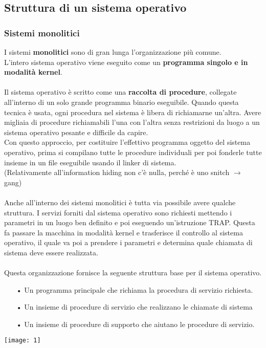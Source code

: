 \documentclass{article}
\begin{document}
\newpage
\subsection{Struttura di un sistema operativo}
\subsubsection{Sistemi monolitici}
I sistemi \textbf{monolitici} sono di gran lunga l’organizzazione più comune.
\\L’intero sistema operativo viene eseguito come un \textbf{programma singolo e in modalità kernel}.
\\\\Il sistema operativo è scritto come una \textbf{raccolta di procedure}, collegate all’interno di un solo grande programma binario eseguibile. Quando questa tecnica è usata, ogni procedura nel sistema è libera di richiamarne un’altra. Avere migliaia di procedure richiamabili l’una con l’altra senza restrizioni da luogo a un sistema operativo pesante e difficile da capire.
\\Con questo approccio, per costituire l’effettivo programma oggetto del sistema operativo, prima si compilano tutte le procedure individuali per poi fonderle tutte insieme in un file eseguibile usando il linker di sistema. 
\\(Relativamente all'information hiding non c’è nulla, perché è uno snitch $\rightarrow$ gang)
\\\\Anche all’interno dei sistemi monolitici è tutta via possibile avere qualche struttura. I servizi forniti dal sistema operativo sono richiesti mettendo i parametri in un luogo ben definito e poi eseguendo un'istruzione TRAP. Questa fa passare la macchina in modalità kernel e trasferisce il controllo al sistema operativo, il quale va poi a prendere i parametri e determina quale chiamata di sistema deve essere realizzata.
\\
\\
Questa organizzazione fornisce la seguente struttura base per il sistema operativo. 
\begin{enumerate}
   \item[•] Un programma principale che richiama la procedura di servizio richiesta.
   \item[•] Un insieme di procedure di servizio che realizzano le chiamate di sistema
   \item[•] Un insieme di procedure di supporto che aiutano le procedure di servizio. 
\end{enumerate}
\texttt{[image: 1]}
\end{document}

